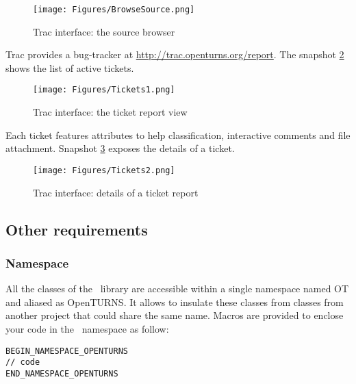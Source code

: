 \begin{figure}[ht]
\begin{center}
\texttt{[image: Figures/BrowseSource.png]}
\caption{Trac interface: the source browser}\label{fig:browser}
\end{center}

\end{figure}

Trac provides a bug-tracker at \url{http://trac.openturns.org/report}. The snapshot \ref{fig:ticket1} shows the list of active tickets.

\begin{figure}[ht]
\begin{center}
\texttt{[image: Figures/Tickets1.png]}
\caption{Trac interface: the ticket report view}\label{fig:ticket1}
\end{center}

\end{figure}

Each ticket features attributes to help classification, interactive comments and file attachment. Snapshot \ref{fig:ticket2} exposes the details of a ticket.

\begin{figure}[ht]
\begin{center}
\texttt{[image: Figures/Tickets2.png]}
\caption{Trac interface: details of a ticket report}\label{fig:ticket2}
\end{center}
\end{figure}

\subsection{Other requirements}

\label{namespace}\subsubsection{Namespace}

All the classes of the \OT\ library are accessible within a single namespace named OT and aliased as OpenTURNS. It allows to insulate these classes from classes from another project that could share the same name. Macros are provided to enclose your code in the \OT\ namespace as follow:

\begin{lstlisting}
BEGIN_NAMESPACE_OPENTURNS
// code
END_NAMESPACE_OPENTURNS
\end{lstlisting}

